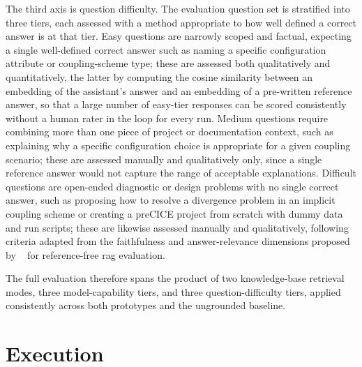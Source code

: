 \documentclass[
  numbers=noenddot,
  english,
  a4paper,
  twoside,
  bibliography=totoc,
  headsepline,
  cleardoublepage=empty,
  parskip=half,
  draft=false
]{scrbook}
\theoremstyle{break}
\renewcommand{\_}{\textunderscore\allowbreak}
\begin{document}
The third axis is question difficulty. The evaluation question set is stratified into three
tiers, each assessed with a method appropriate to how well defined a correct answer is at
that tier. Easy questions are narrowly scoped and factual, expecting a single well-defined
correct answer such as naming a specific configuration attribute or coupling-scheme type;
these are assessed both qualitatively and quantitatively, the latter by computing the cosine
similarity between an embedding of the assistant's answer and an embedding of a pre-written
reference answer, so that a large number of easy-tier responses can be scored consistently
without a human rater in the loop for every run. Medium questions require combining more than
one piece of project or documentation context, such as explaining why a specific configuration
choice is appropriate for a given coupling scenario; these are assessed manually and
qualitatively only, since a single reference answer would not capture the range of acceptable
explanations. Difficult questions are open-ended diagnostic or design problems with no single
correct answer, such as proposing how to resolve a divergence problem in an implicit coupling
scheme or creating a preCICE project from scratch with dummy data and run scripts; these are
likewise assessed manually and qualitatively, following criteria adapted from the faithfulness
and answer-relevance dimensions proposed by \citeauthor{es2023ragas}~\cite{es2023ragas} for
reference-free \gls{rag} evaluation.

The full evaluation therefore spans the product of two knowledge-base retrieval modes, three
model-capability tiers, and three question-difficulty tiers, applied consistently across both
prototypes and the ungrounded baseline.


\section{Execution}\label{sec:evaluation:execution}
\end{document}
